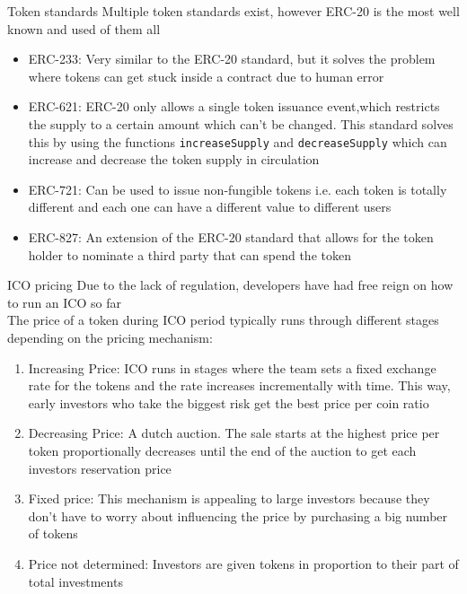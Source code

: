 \documentclass[10pt]{beamer}
\begin{document}
\begin{frame}{Token standards}
	Multiple token standards exist, however ERC-20 is the most well known and used of them all
	\begin{itemize}
		\item ERC-233: Very similar to the ERC-20 standard, but it solves the problem where tokens can get stuck inside a contract due to human error
		\item ERC-621: ERC-20 only allows a single token issuance event,which restricts the supply to a certain amount which can't be changed. This standard solves this by using the functions \texttt{increaseSupply} and \texttt{decreaseSupply} which can increase and decrease the token supply in circulation
		\item ERC-721: Can be used to issue non-fungible tokens i.e. each token is totally different and each one can have a different value to different users
		\item ERC-827: An extension of the ERC-20 standard that allows for the token holder to nominate a third party that can spend the token
	\end{itemize}
\end{frame}



\begin{frame}{ICO pricing}
	Due to the lack of regulation, developers have had free reign on how to run an ICO so far\\ \vspace{3mm}
	The price of a token during ICO period typically runs through different stages depending on the pricing mechanism:
	\begin{small}
		\begin{enumerate}
			\item Increasing Price: ICO runs in stages where the team sets a fixed exchange rate for the tokens and the rate increases incrementally with time. This way, early investors who take the biggest risk get the best price per coin ratio
			\item Decreasing Price: A dutch auction. The sale starts at the highest price per token proportionally decreases until the end of the auction to get each investors reservation price
			\item Fixed price: This mechanism is appealing to large investors because they don't have to worry about influencing the price by purchasing a big number of tokens
			\item Price not determined: Investors are given tokens in proportion to their part of total investments
		\end{enumerate}
	\end{small}
\end{frame}
\end{document}
